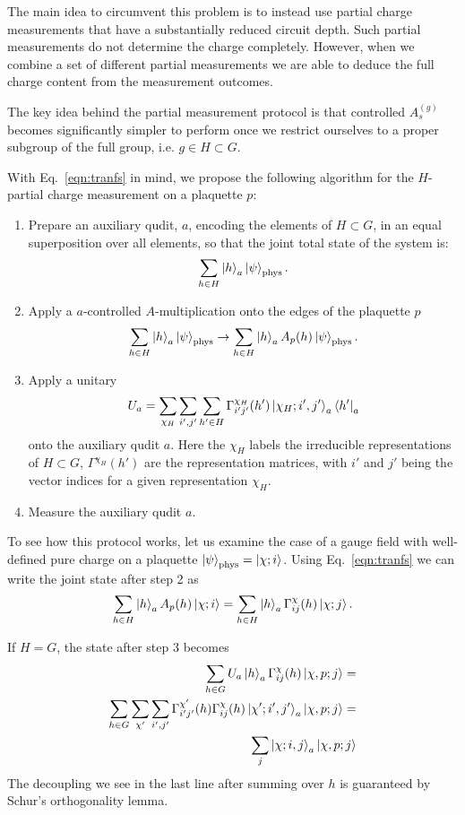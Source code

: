 \documentclass[two column]{article}
\begin{document}
The main idea to circumvent this problem is to instead use partial charge measurements that have a substantially reduced circuit depth. Such partial measurements do not determine the charge completely. However, when we combine a set of different partial measurements we are able to deduce the full charge content from the measurement outcomes.

The key idea behind the partial measurement protocol is that controlled $A_s^{(g)}$ becomes significantly simpler to perform once we restrict ourselves to a proper subgroup of the full group, i.e. $g \in H \subset G$.

With Eq.~\eqref{eqn:tranfs} in mind, we propose the following algorithm for the $H$-partial charge measurement on a plaquette $p$:\begin{enumerate}
    \item Prepare an auxiliary qudit, $a$, encoding the elements of $H\subset G$, in an equal superposition over all elements, so that the joint total state of the system is: $$ \sum_{h \in H} \ket{h}_a\ket{\psi}_\text{phys}. $$
    \item Apply a $a$-controlled $A$-multiplication onto the edges of the plaquette $p$$$ \sum_{h \in H} \ket{h}_a\ket{\psi}_\text{phys} \rightarrow \sum_{h \in H} \ket{h}_a A_p{(h)} \ket{\psi}_\text{phys}. $$
    \item Apply a unitary $$ U_a = \sum_{\chi_H}\sum_{i', j'}\sum_{h'\in H}  \Gamma^{\chi_H}_{i'j'}(h')  \ket{\chi_H; i', j'}_a\bra{h'}_a $$ onto the auxiliary qudit $a$. Here the $\chi_H$ labels the irreducible representations of $H \subset G$, $\Gamma^{\chi_H}(h')$ are the representation matrices, with $i'$ and $j'$ being the vector indices for a given representation $\chi_H$.
    \item Measure the auxiliary qudit $a$.
\end{enumerate}

To see how this protocol works, let us examine the case of a  gauge field with well-defined pure charge on a plaquette  $\ket{\psi}_\text{phys} = \ket{\chi; i}$. Using  Eq.~\eqref{eqn:tranfs} we can write the joint state after step 2 as
\begin{equation}
    \sum_{h \in H} \ket{h}_a A_p{(h)} \ket{\chi; i} = \sum_{h \in H} \ket{h}_a \Gamma^{\chi}_{ij}(h) \ket{\chi; j}.
\end{equation}

If $H = G$, the state after step 3 becomes\begin{equation}
    \begin{split}
        \sum_{h \in G} U_a\ket{h}_a \Gamma^{\chi}_{ij}(h) \ket{\chi, p; j} = \\
        \sum_{h \in G} \sum_{\chi'}\sum_{i', j'}  \Gamma^{\chi'}_{i'j'}(h)\Gamma^{\chi}_{ij}(h) \ket{\chi'; i', j'}_a \ket{\chi, p; j} =\\
        \sum_j\ket{\chi; i, j}_a \ket{\chi, p; j}
    \end{split}
\end{equation}
The decoupling we see in the last line after summing over $h$ is guaranteed by Schur's orthogonality lemma.
\end{document}
